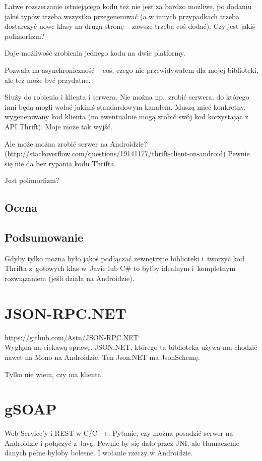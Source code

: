 Łatwe rozszerzanie istniejącego kodu też nie jest za bardzo możliwe, po dodaniu jakiś typów trzeba wszystko przegenerować (a w innych przypadkach trzeba dostarczyć nowe klasy na drugą stronę -- zawsze trzeba coś dodać).
Czy jest jakiś polimorfizm?

Daje możliwość zrobienia jednego kodu na dwie platformy.

Pozwala na asynchroniczność -- coś, czego nie przewidywałem dla mojej biblioteki, ale też może być przydatne.

Służy do robienia i klienta i serwera. Nie można np.\ zrobić serwera, do którego inni będą mogli wołać jakimś standardowym kanałem. Muszą mieć konkretny, wygenerowany kod klienta (no ewentualnie mogą zrobić swój kod korzystając z API Thrift). Moje może tak wyjść.

Ale może można zrobić serwer na Androidzie? (\url{http://stackoverflow.com/questions/19141177/thrift-client-on-android}) Pewnie się nie da bez rypania kodu Thrifta.

Jest polimorfizm?

\subsection{Ocena}
\subsection{Podsumowanie}
Gdyby tylko można było jakoś podłączać zewnętrzne biblioteki i~tworzyć kod Thrifta z~gotowych klas w~Javie lub C\# to byłby idealnym i~kompletnym rozwiązaniem (jeśli działa na Androidzie). 



\section{JSON-RPC.NET}
\url{https://github.com/Astn/JSON-RPC.NET} \\
Wygląda na ciekawą sprawę. JSON.NET, którego ta biblioteka używa ma chodzić nawet na Mono na Androidzie. Ten Json.NET ma JsonSchemę.

Tylko nie wiem, czy ma klienta.



\section{gSOAP}
Web Service'y i REST w C/C++. Pytanie, czy można posadzić serwer na Androidzie i połączyć z Javą.
Pewnie by się dało przez JNI, ale tłumaczenie danych pełne byłoby bolesne. I wołanie rzeczy w Androidzie.



